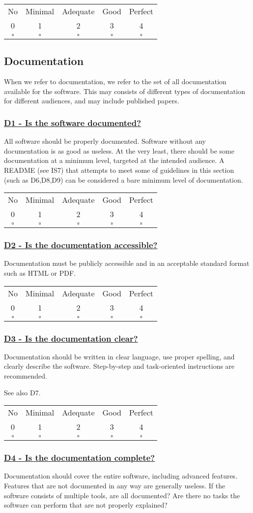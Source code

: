\documentclass[a4paper,11pt]{article}
\newcommand{\criterion}[2]{\subsubsection*{\underline{#1 - #2}}\label{id:#1}}
\newcommand\CheckTable{%
  \begin{tabular}{ccccc}
    No & Minimal & Adequate & Good & Perfect \\
    0 & 1 & 2 & 3 & 4 \\
    \hline
    $\square$ & $\square$ & $\square$ & $\square$ & $\square$ \\
  \end{tabular}%
}
\begin{document}
\CheckTable

\subsection{Documentation}\label{sec:doc}

When we refer to documentation, we refer to the set of all documentation
available for the software. This may consists of different types of
documentation for different audiences, and may include published papers.

\newcommand{\dOneID}{D1}
\newcommand{\dOneText}{Is the software documented?}
\criterion{\dOneID}{\dOneText}

All software should be properly documented. Software without any documentation
is as good as useless. At the very least, there should be some documentation at
a minimum level, targeted at the intended audience. A README (see IS7) that
attempts to meet some of guidelines in this section (such as D6,D8,D9) can be
considered a bare minimum level of documentation.

\CheckTable

%
%
%

\newcommand{\dTwoID}{D2}
\newcommand{\dTwoText}{Is the documentation accessible?}
\criterion{\dTwoID}{\dTwoText}

Documentation must be publicly accessible and in an acceptable standard format
such as HTML or PDF.

\CheckTable

\newcommand{\dThreeID}{D3}
\newcommand{\dThreeText}{Is the documentation clear?}
\criterion{\dThreeID}{\dThreeText}

Documentation should be written in clear language, use proper spelling, and
clearly describe the software. Step-by-step and task-oriented instructions are
recommended.

See also D7.

\CheckTable

\newcommand{\dFourID}{D4}
\newcommand{\dFourText}{Is the documentation complete?}
\criterion{\dFourID}{\dFourText}

Documentation should cover the entire software, including advanced features.
Features that are not documented in any way are generally useless. If the
software consists of multiple tools, are all documented? Are there no tasks the
software can perform that are not properly explained?
\end{document}
